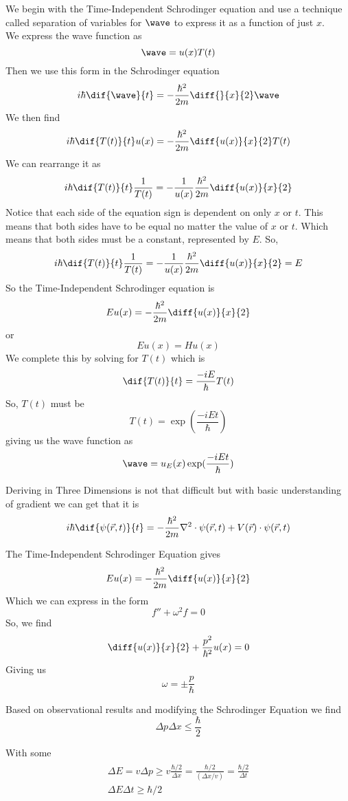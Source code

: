 \begin{ans}
	We begin with the Time-Independent Schrodinger equation and use a technique called separation of variables for $ \wave $ to express it as a function of just $ x $. \\
	We express the wave function as
	\[ \wave = u(x)T(t) \]
	Then we use this form in the Schrodinger equation
	\[ i\hbar \dif{\wave}{t} = -\frac{\hbar^2}{2m} \diff{}{x}{2} \wave \]
	We then find
	\[ i\hbar \dif{T(t)}{t} u(x) = -\frac{\hbar^2}{2m} \diff{u(x)}{x}{2} T(t)\]
	We can rearrange it as
	\[ i\hbar \dif{T(t)}{t} \frac{1}{T(t)} = -\frac{1}{u(x)}\frac{\hbar^2}{2m} \diff{u(x)}{x}{2} \]
	Notice that each side of the equation sign is dependent on only $ x $ or $ t $. This means that both sides have to be equal no matter the value of $ x $ or $ t $. Which means that both sides must be a constant, represented by $ E $. So, 
	\[ i\hbar \dif{T(t)}{t} \frac{1}{T(t)} = -\frac{1}{u(x)}\frac{\hbar^2}{2m} \diff{u(x)}{x}{2} = E\]
	So the Time-Independent Schrodinger equation is 
	\[ Eu(x) =  -\frac{\hbar^2}{2m} \diff{u(x)}{x}{2}\]
	or
	\[ Eu(x) = Hu(x) \]
	We complete this by solving for $ T(t) $ which is 
	\[ \dif{T(t)}{t} = \frac{-i E}{\hbar} T(t) \]
	So, $ T(t) $ must be
	\[ T(t) = \exp(\frac{-iEt}{\hbar}) \]
	giving us the wave function as
	\[ \wave = u_E(x) \exp(\frac{-iEt}{\hbar}) \]
\end{ans}
\begin{ans}
	Deriving in Three Dimensions is not that difficult but with basic understanding of gradient we can get that it is 
	\[ i \hbar \dif{\psi(\vec{r}, t)}{t} = -\frac{\hbar^2}{2m} \nabla^2 \cdot \psi(\vec{r}, t) + V(\vec{r}) \cdot \psi(\vec{r}, t) \]
\end{ans}
\begin{ans}
	The Time-Independent Schrodinger Equation gives 
	\[ Eu(x) = -\frac{\hbar^2}{2m} \diff{u(x)}{x}{2}\]
	Which we can express in the form
	\[ f'' + \omega^2 f = 0 \]
	So, we find
	\[ \diff{u(x)}{x}{2} + \frac{p^2}{\hbar^2} u(x) = 0  \]
	Giving us
	\[ \omega = \pm \frac{p}{\hbar} \]
\end{ans}
\begin{ans}
	Based on observational results and modifying the Schrodinger Equation we find
	\[ \Delta p \Delta x \leq \dfrac{\hbar}{2} \]
\end{ans}
\begin{ans}
	With some 
	\begin{align}
	\begin{array} { c } { \Delta E = v \Delta p \geq v \frac { \hbar / 2 } { \Delta x } = \frac { \hbar / 2 } { ( \Delta x / v ) } = \frac { \hbar / 2 } { \Delta t } } \\ { \Delta E \Delta t \geq \hbar / 2 } \end{array}
	\end{align}
\end{ans}
